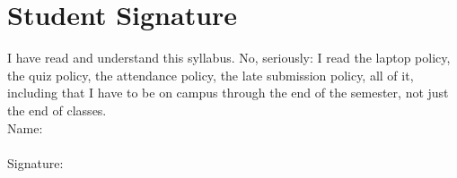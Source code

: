 \documentclass[12pt]{article}
\begin{document}
\section{Student Signature}

I have read and understand this syllabus. No, seriously: I read the laptop policy, the quiz policy, the attendance policy, the late submission policy, all of it, including that I have to be on campus through the end of the semester, not just the end of classes. \\


Name: \\
\vspace{2cm}\\
Signature:
\end{document}
